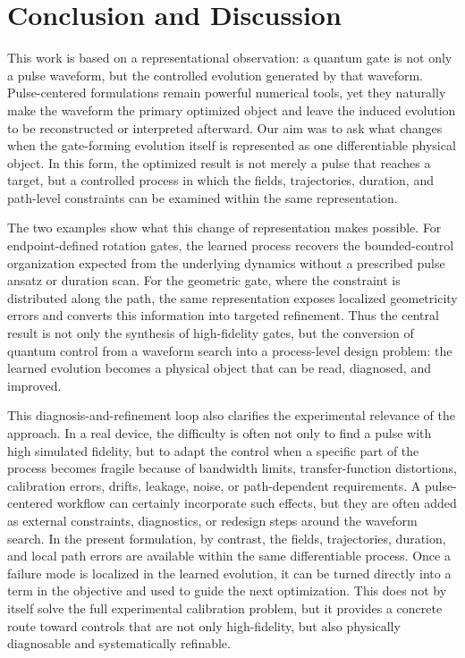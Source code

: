 \documentclass[aps,prx,reprint,superscriptaddress,nofootinbib,longbibliography,floatfix,showkeys]{revtex4-2}
\begin{document}
\FloatBarrier

\section{Conclusion and Discussion}

This work is based on a representational observation: a quantum gate is not
only a pulse waveform, but the controlled evolution generated by that
waveform.  Pulse-centered formulations remain powerful numerical tools, yet
they naturally make the waveform the primary optimized object and leave the
induced evolution to be reconstructed or interpreted afterward.  Our aim was
to ask what changes when the gate-forming evolution itself is represented as
one differentiable physical object.  In this form, the optimized result is
not merely a pulse that reaches a target, but a controlled process in which
the fields, trajectories, duration, and path-level constraints can be
examined within the same representation.

The two examples show what this change of representation makes possible.
For endpoint-defined rotation gates, the learned process recovers the
bounded-control organization expected from the underlying dynamics without a
prescribed pulse ansatz or duration scan.  For the geometric gate, where the
constraint is distributed along the path, the same representation exposes
localized geometricity errors and converts this information into targeted
refinement.  Thus the central result is not only the synthesis of
high-fidelity gates, but the conversion of quantum control from a waveform
search into a process-level design problem: the learned evolution becomes a
physical object that can be read, diagnosed, and improved.

This diagnosis-and-refinement loop also clarifies the experimental relevance
of the approach.  In a real device, the difficulty is often not only to find
a pulse with high simulated fidelity, but to adapt the control when a
specific part of the process becomes fragile because of bandwidth limits,
transfer-function distortions, calibration errors, drifts, leakage, noise,
or path-dependent requirements.  A pulse-centered workflow can certainly
incorporate such effects, but they are often added as external constraints,
diagnostics, or redesign steps around the waveform search.  In the present
formulation, by contrast, the fields, trajectories, duration, and local
path errors are available within the same differentiable process.  Once a
failure mode is localized in the learned evolution, it can be turned
directly into a term in the objective and used to guide the next
optimization.  This does not by itself solve the full experimental
calibration problem, but it provides a concrete route toward controls that
are not only high-fidelity, but also physically diagnosable and
systematically refinable.
\end{document}
